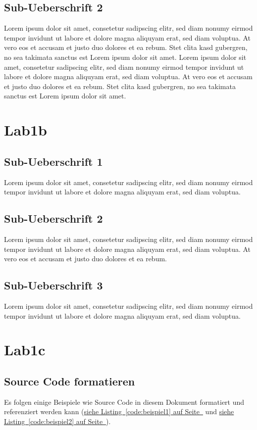\documentclass[12pt,a4paper,titlepage,oneside]{scrartcl}
\begin{document}
\subsection{Sub-Ueberschrift 2}
Lorem ipsum dolor sit amet, consetetur sadipscing elitr, sed diam nonumy eirmod tempor invidunt ut labore et dolore magna aliquyam erat, sed diam voluptua. At vero eos et accusam et justo duo dolores et ea rebum. Stet clita kasd gubergren, no sea takimata sanctus est Lorem ipsum dolor sit amet. Lorem ipsum dolor sit amet, consetetur sadipscing elitr, sed diam nonumy eirmod tempor invidunt ut labore et dolore magna aliquyam erat, sed diam voluptua. At vero eos et accusam et justo duo dolores et ea rebum. Stet clita kasd gubergren, no sea takimata sanctus est Lorem ipsum dolor sit amet.

\section{Lab1b}

\subsection{Sub-Ueberschrift 1}
Lorem ipsum dolor sit amet, consetetur sadipscing elitr, sed diam nonumy eirmod tempor invidunt ut labore et dolore magna aliquyam erat, sed diam voluptua. 

\subsection{Sub-Ueberschrift 2}
Lorem ipsum dolor sit amet, consetetur sadipscing elitr, sed diam nonumy eirmod tempor invidunt ut labore et dolore magna aliquyam erat, sed diam voluptua. At vero eos et accusam et justo duo dolores et ea rebum. 

\subsection{Sub-Ueberschrift 3}
Lorem ipsum dolor sit amet, consetetur sadipscing elitr, sed diam nonumy eirmod tempor invidunt ut labore et dolore magna aliquyam erat, sed diam voluptua. 

\section{Lab1c}

\subsection{Source Code formatieren}
Es folgen einige Beispiele wie Source Code in diesem Dokument formatiert und referenziert werden kann
(\hyperref[code:beispiel1]{siehe Listing~\ref*{code:beispiel1} auf Seite~\pageref*{code:beispiel1}} und \hyperref[code:beispiel2]{siehe Listing~\ref*{code:beispiel2} auf Seite~\pageref*{code:beispiel2}}).
\end{document}
